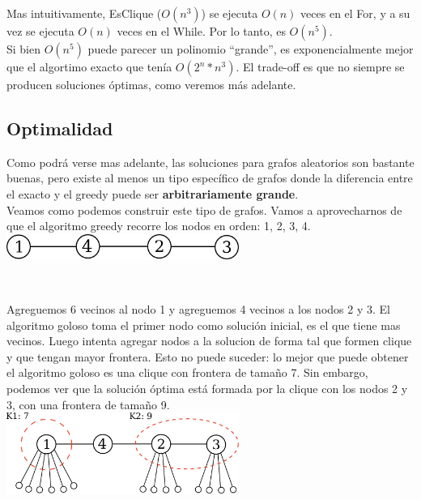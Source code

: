 Mas intuitivamente, EsClique ($O(n^3)$) se ejecuta $O(n)$ veces en el For, y a su vez se ejecuta $O(n)$ veces en el While. Por lo tanto, es $O(n^5)$. \\

Si bien $O(n^5)$ puede parecer un polinomio ``grande'', es exponencialmente mejor que el algortimo exacto que tenía $O(2^{n} * n^{3})$. El trade-off es que no siempre se producen soluciones óptimas, como veremos más adelante. \\

\subsection{Optimalidad}

Como podrá verse mas adelante, las soluciones para grafos aleatorios son bastante buenas, pero existe al menos un tipo específico de grafos donde la diferencia entre el exacto y el greedy puede ser \textbf{arbitrariamente grande}. \\

Veamos como podemos construir este tipo de grafos. Vamos a aprovecharnos de que el algoritmo greedy recorre los nodos en orden: 1, 2, 3, 4. \\

{\centering
    \includegraphics[width=0.57\textwidth]{informe/imgs/greedy_base.png} \\
}

$ $\newline

Agreguemos 6 vecinos al nodo 1 y agreguemos 4 vecinos a los nodos 2 y 3. El algoritmo goloso toma el primer nodo como solución inicial, es el que tiene mas vecinos. Luego intenta agregar nodos a la solucion de forma tal que formen clique y que tengan mayor frontera. Esto no puede suceder: lo mejor que puede obtener el algoritmo goloso es una clique con frontera de tamaño 7. Sin embargo, podemos ver que la solución óptima está formada por la clique con los nodos 2 y 3, con una frontera de tamaño 9.\\

{\centering
    \includegraphics[width=0.57\textwidth]{informe/imgs/greedy_base_nodes_v1.png} \\
}
$ $\newline

